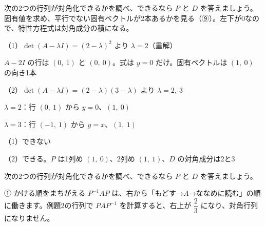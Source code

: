 \begin{reidai}[対角化できるかを調べる]
次の2つの行列が対角化できるかを調べ、できるなら $P$ と $D$ を答えましょう。
\kangaekata 固有値を求め、平行でない固有ベクトルが2本あるかを見る（⑨）。左下が0なので、特性方程式は対角成分の積になる。\par
\shiki\kviijs{}\zw{} （1）$\det(A-\lambda I)=(2-\lambda)^2$ より $\lambda=2$（重解）\par
\kviijb $A-2I$ の行は $(0,\ 1)$ と $(0,\ 0)$。式は $y=0$ だけ。固有ベクトルは $(1,\ 0)$ の向き1本\par
\kviija （2）$\det(A-\lambda I)=(2-\lambda)(3-\lambda)$ より $\lambda=2,\ 3$\par
\kviijb $\lambda=2$：行 $(0,\ 1)$ から $y=0$、$(1,\ 0)$\par
\kviijb $\lambda=3$：行 $(-1,\ 1)$ から $y=x$、$(1,\ 1)$\par
\kotae\kviijs{}\zw{} （1）できない\par
\kviijb （2）できる。$P$ は1列め $(1,\ 0)$、2列め $(1,\ 1)$、$D$ の対角成分は2と3
\end{reidai}

\begin{jibun}
次の2つの行列が対角化できるかを調べ、できるなら $P$ と $D$ を答えましょう。
\end{jibun}


\begin{tsumazuki}{① かける順をまちがえる}
$P^{-1}AP$ は、右から「もどす→$A$→ななめに読む」の順に働きます。例題2の行列で $PAP^{-1}$ を計算すると、右上が $\dfrac23$ になり、対角行列になりません。
\end{tsumazuki}

